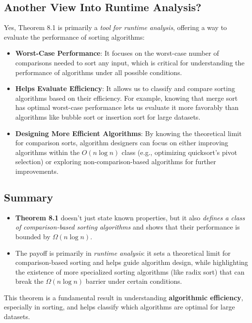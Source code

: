\documentclass{article}
\begin{document}
\subsection{Another View Into Runtime Analysis?}

Yes, Theorem 8.1 is primarily a \textit{tool for runtime analysis}, offering a way to evaluate the performance of sorting algorithms:
\begin{itemize}
    \item \textbf{Worst-Case Performance}: It focuses on the worst-case number of comparisons needed to sort any input, which is critical for understanding the performance of algorithms under all possible conditions.
    \item \textbf{Helps Evaluate Efficiency}: It allows us to classify and compare sorting algorithms based on their efficiency. For example, knowing that merge sort has optimal worst-case performance lets us evaluate it more favorably than algorithms like bubble sort or insertion sort for large datasets.
    \item \textbf{Designing More Efficient Algorithms}: By knowing the theoretical limit for comparison sorts, algorithm designers can focus on either improving algorithms within the \( O(n \log n) \) class (e.g., optimizing quicksort's pivot selection) or exploring non-comparison-based algorithms for further improvements.
\end{itemize}

\subsection{Summary}
\begin{itemize}
    \item \textbf{Theorem 8.1} doesn’t just state known properties, but it also \textit{defines a class of comparison-based sorting algorithms} and shows that their performance is bounded by \( \Omega(n \log n) \).
    \item The payoff is primarily in \textit{runtime analysis}: it sets a theoretical limit for comparison-based sorting and helps guide algorithm design, while highlighting the existence of more specialized sorting algorithms (like radix sort) that can break the \( \Omega(n \log n) \) barrier under certain conditions.
\end{itemize}
This theorem is a fundamental result in understanding \textbf{algorithmic efficiency}, especially in sorting, and helps classify which algorithms are optimal for large datasets.
\end{document}
